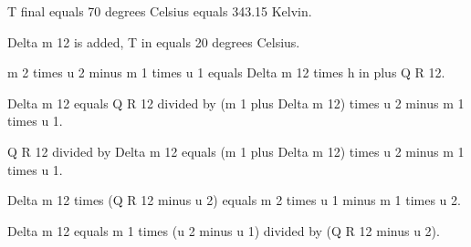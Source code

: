 T final equals 70 degrees Celsius equals 343.15 Kelvin.  

Delta m 12 is added, T in equals 20 degrees Celsius.  

m 2 times u 2 minus m 1 times u 1 equals Delta m 12 times h in plus Q R 12.  

Delta m 12 equals Q R 12 divided by (m 1 plus Delta m 12) times u 2 minus m 1 times u 1.  

Q R 12 divided by Delta m 12 equals (m 1 plus Delta m 12) times u 2 minus m 1 times u 1.  

Delta m 12 times (Q R 12 minus u 2) equals m 2 times u 1 minus m 1 times u 2.  

Delta m 12 equals m 1 times (u 2 minus u 1) divided by (Q R 12 minus u 2).